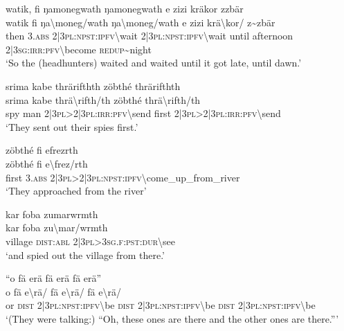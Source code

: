 \ea\label{ex:5:a1553}
watik, fi ŋamonegwath ŋamonegwath e zizi kräkor zzbär\\
\gll watik	fi	ŋa{\textbackslash}moneg/wath	ŋa{\textbackslash}moneg/wath	e	zizi	krä{\textbackslash}kor/	z{\textasciitilde}zbär\\
     then	3.\textsc{abs}	2|3\textsc{pl}:\textsc{npst}:\textsc{ipfv}{\textbackslash}wait	2|3\textsc{pl}:\textsc{npst}:\textsc{ipfv}{\textbackslash}wait	until	afternoon	2|3\textsc{sg}:\textsc{irr}:\textsc{pfv}{\textbackslash}become	\textsc{redup}{\textasciitilde}night\\
\glt `So the (headhunters) waited and waited until it got late, until dawn.'
\z

\ea\label{ex:5:a1555}
srima kabe thrärifthth zöbthé thrärifthth\\
\gll srima	kabe	thrä{\textbackslash}rifth/th	zöbthé	thrä{\textbackslash}rifth/th\\
     spy	man	2|3\textsc{pl}>2|3\textsc{pl}:\textsc{irr}:\textsc{pfv}{\textbackslash}send	first	2|3\textsc{pl}>2|3\textsc{pl}:\textsc{irr}:\textsc{pfv}{\textbackslash}send\\
\glt `They sent out their spies first.'
\z

\ea\label{ex:5:a1556}
zöbthé fi efrezrth\\
\gll zöbthé	fi	e{\textbackslash}frez/rth\\
     first	3.\textsc{abs}	2|3\textsc{pl}>2|3\textsc{pl}:\textsc{npst}:\textsc{ipfv}{\textbackslash}come\_up\_from\_river\\
\glt `They approached from the river'
\z

\ea\label{ex:5:a1557}
kar foba zumarwrmth\\
\gll kar	foba	zu{\textbackslash}mar/wrmth\\
     village	\textsc{dist}:\textsc{abl}	2|3\textsc{pl}>3\textsc{sg}.\textsc{f}:\textsc{pst}:\textsc{dur}{\textbackslash}see\\
\glt `and spied out the village from there.'
\z

\ea\label{ex:5:a1558}
``o fä erä fä erä fä erä''\\
\gll o	fä	e{\textbackslash}rä/	fä	e{\textbackslash}rä/	fä	e{\textbackslash}rä/\\
     or	\textsc{dist}	2|3\textsc{pl}:\textsc{npst}:\textsc{ipfv}{\textbackslash}be	\textsc{dist}	2|3\textsc{pl}:\textsc{npst}:\textsc{ipfv}{\textbackslash}be	\textsc{dist}	2|3\textsc{pl}:\textsc{npst}:\textsc{ipfv}{\textbackslash}be\\
\glt `(They were talking:) ``Oh, these ones are there and the other ones are there.'''
\z

